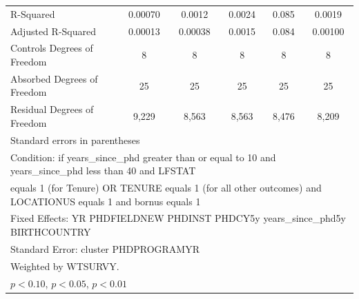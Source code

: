 \begin{table}[htbp]
\begin{tabular}{l*{5}{c}}
R-Squared&     0.00070         &      0.0012         &      0.0024         &       0.085         &      0.0019         \\
Adjusted R-Squared&     0.00013         &     0.00038         &      0.0015         &       0.084         &     0.00100         \\
Controls Degrees of Freedom&           8         &           8         &           8         &           8         &           8         \\
Absorbed Degrees of Freedom&          25         &          25         &          25         &          25         &          25         \\
Residual Degrees of Freedom&       9,229         &       8,563         &       8,563         &       8,476         &       8,209         \\
\hline\hline
\multicolumn{6}{l}{\footnotesize Standard errors in parentheses}\\
\multicolumn{6}{l}{\footnotesize Condition: if years\_since\_phd greater than or equal to 10 and years\_since\_phd less than 40 and LFSTAT}\\
\multicolumn{6}{l}{\footnotesize equals 1 (for Tenure) OR TENURE equals 1 (for all other outcomes) and LOCATIONUS equals 1 and bornus equals 1}\\
\multicolumn{6}{l}{\footnotesize Fixed Effects: YR PHDFIELDNEW PHDINST PHDCY5y years\_since\_phd5y BIRTHCOUNTRY}\\
\multicolumn{6}{l}{\footnotesize Standard Error: cluster PHDPROGRAMYR}\\
\multicolumn{6}{l}{\footnotesize Weighted by WTSURVY.}\\
\multicolumn{6}{l}{\footnotesize \sym{*} \(p<0.10\), \sym{**} \(p<0.05\), \sym{***} \(p<0.01\)}\\
\end{tabular}
\end{table}
